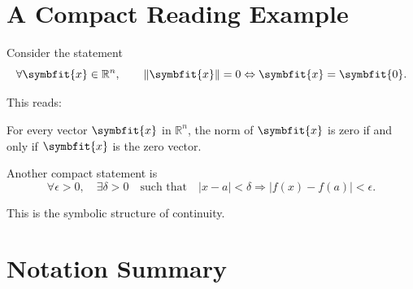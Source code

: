 \documentclass[11pt,twocolumn]{article}
\newcommand{\R}{\mathbb{R}}
\newcommand{\vct}[1]{\symbfit{#1}}   %
\newcommand{\norm}[1]{\left\lVert #1 \right\rVert}
\newcommand{\abs}[1]{\left\lvert #1 \right\rvert}
\begin{document}
\section{A Compact Reading Example}

Consider the statement
\[
\forall \vct{x}\in\R^n,
\qquad
\norm{\vct{x}}=0
\Leftrightarrow
\vct{x}=\vct{0}.
\]

This reads:

For every vector \(\vct{x}\) in \(\R^n\), the norm of \(\vct{x}\) is zero
if and only if \(\vct{x}\) is the zero vector.

Another compact statement is
\[
\forall \epsilon>0,
\quad
\exists \delta>0
\quad
\text{such that}
\quad
\abs{x-a}<\delta
\Rightarrow
\abs{f(x)-f(a)}<\epsilon.
\]

This is the symbolic structure of continuity.

\section{Notation Summary}
\end{document}
